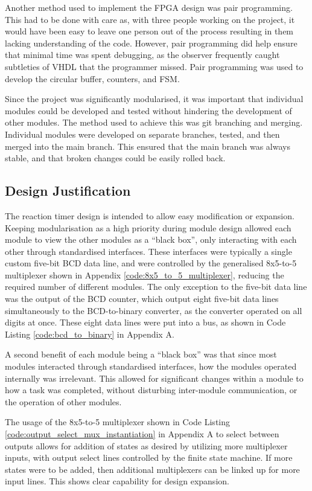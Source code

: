 \documentclass[11pt]{article}
\begin{document}
Another method used to implement the FPGA design was pair programming. This had to be done with care as, with three people working on the project, it would have been easy to leave one person out of the process resulting in them lacking understanding of the code. However, pair programming did help ensure that minimal time was spent debugging, as the observer frequently caught subtleties of VHDL that the programmer missed. Pair programming was used to develop the circular buffer, counters, and FSM.

Since the project was significantly modularised, it was important that individual modules could be developed and tested without hindering the development of other modules. The method used to achieve this was git branching and merging. Individual modules were developed on separate branches, tested, and then merged into the main branch. This ensured that the main branch was always stable, and that broken changes could be easily rolled back.

\subsection{Design Justification}

The reaction timer design is intended to allow easy modification or expansion. Keeping modularisation as a high priority during module design allowed each module to view the other modules as a ``black box'', only interacting with each other through standardised interfaces. These interfaces were typically a single custom five-bit BCD data line, and were controlled by the generalised 8x5-to-5 multiplexer shown in Appendix \ref{code:8x5_to_5_multiplexer}, reducing the required number of different modules. The only exception to the five-bit data line was the output of the BCD counter, which output eight five-bit data lines simultaneously to the BCD-to-binary converter, as the converter operated on all digits at once. These eight data lines were put into a bus, as shown in Code Listing \ref{code:bcd_to_binary} in Appendix A.

A second benefit of each module being a ``black box'' was that since most modules interacted through standardised interfaces, how the modules operated internally was irrelevant. This allowed for significant changes within a module to how a task was completed, without disturbing inter-module communication, or the operation of other modules.

The usage of the 8x5-to-5 multiplexer shown in Code Listing \ref{code:output_select_mux_instantiation} in Appendix A to select between outputs allows for addition of states as desired by utilizing more multiplexer inputs, with output select lines controlled by the finite state machine. If more states were to be added, then additional multiplexers can be linked up for more input lines. This shows clear capability for design expansion.
\end{document}
